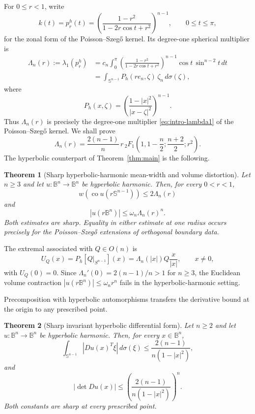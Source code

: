 \documentclass[11pt,reqno]{amsart}
\newtheorem{theorem}{Theorem}[section]
\theoremstyle{remark}
\begin{document}
For $0\le r<1$, write
\[k(t)=
 p_r^h(t)
 =
 \left(\frac{1-r^2}{1-2r\cos t+r^2}\right)^{n-1},
 \qquad 0\le t\le\pi,
\]
for the zonal form of the Poisson--Szeg\H{o} kernel.  Its degree-one
spherical multiplier is
\begin{equation}\label{eq:hyp-Lambda-intro}
\begin{aligned}
 \Lambda_n(r)
 :=\lambda_1(p_r^h)
 &=
 c_n\int_0^\pi
 \left(\frac{1-r^2}{1-2r\cos t+r^2}\right)^{n-1}
 \cos t\,\sin^{n-2}t\,dt\\
 &=
 \int_{\mathbb S^{n-1}}P_h(re_n,\zeta)\,\zeta_n\,d\sigma(\zeta),
\end{aligned}
\end{equation}
where
\begin{equation}\label{eq:hyp-Ph}
 P_h(x,\zeta)=\left(\frac{1-|x|^2}{|x-\zeta|^2}\right)^{n-1}.
\end{equation}
Thus $\Lambda_n(r)$ is precisely the degree-one multiplier
\eqref{eq:intro-lambda1} of the Poisson--Szeg\H{o} kernel.  We shall prove
\begin{equation}\label{eq:hyp-Lambda-explicit-intro}
 \Lambda_n(r)=\frac{2(n-1)}{n}\,r\,
 {}_2F_1\!\left(1,1-\frac n2;\frac{n+2}{2};r^2\right).
\end{equation}
The hyperbolic counterpart of Theorem~\ref{thm:main} is the following.

\begin{theorem}[Sharp hyperbolic-harmonic mean-width and volume distortion]\label{thm:hyp-main-intro}
Let $n\ge3$ and let $u:\mathbb B^n\to\mathbb B^n$ be hyperbolic harmonic. Then, for every $0<r<1$,
\[
 w\!\left(\operatorname{co}u(r\mathbb S^{n-1})\right)\le2\Lambda_n(r)
\]
and
\[
 |u(r\mathbb B^n)|\le\omega_n\Lambda_n(r)^n.
\]
Both estimates are sharp.  Equality in either estimate at one radius
occurs precisely for the Poisson--Szeg\H{o} extensions of orthogonal
boundary data.
\end{theorem}

The extremal associated with $Q\in O(n)$ is
\[
 U_Q(x)=P_h[Q|_{S^{n-1}}](x)
 =\Lambda_n(|x|)Q\frac{x}{|x|},\qquad x\ne0,
\]
with $U_Q(0)=0$.  Since $\Lambda_n'(0)=2(n-1)/n>1$ for $n\ge3$, the Euclidean volume contraction $|u(r\mathbb B^n)|\le\omega_nr^n$ fails in the hyperbolic-harmonic setting.

Precomposition with hyperbolic automorphisms transfers the derivative
bound at the origin to any prescribed point.

\begin{theorem}[Sharp invariant hyperbolic differential form]\label{thm:hyp-differential-intro}
Let $n\ge2$ and let $u:\mathbb B^n\to\mathbb B^n$ be hyperbolic harmonic.
Then, for every $x\in\mathbb B^n$,
\[
 \int_{\mathbb S^{n-1}}|Du(x)^T\xi|\,d\sigma(\xi)
 \le \frac{2(n-1)}{n(1-|x|^2)},
\]
and
\[
 |\det Du(x)|\le
 \left(\frac{2(n-1)}{n(1-|x|^2)}\right)^n.
\]
Both constants are sharp at every prescribed point.
\end{theorem}
\end{document}

